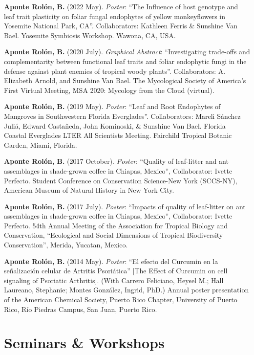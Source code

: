 \documentclass[11pt,a4paper,]{awesome-cv}
\begin{document}
\textbf{Aponte Rolón, B.} (2022 May). \emph{Poster}: ``The Influence of
host genotype and leaf trait plasticity on foliar fungal endophytes of
yellow monkeyflowers in Yosemite National Park, CA''. Collaborators:
Kathleen Ferris \& Sunshine Van Bael. Yosemite Symbiosis Workshop.
Wawona, CA, USA.

\textbf{Aponte Rolón, B.} (2020 July). \emph{Graphical Abstract}:
``Investigating trade-offs and complementarity between functional leaf
traits and foliar endophytic fungi in the defense against plant enemies
of tropical woody plants''. Collaborators: A. Elizabeth Arnold, and
Sunshine Van Bael. The Mycological Society of America's First Virtual
Meeting, MSA 2020: Mycology from the Cloud (virtual).

\textbf{Aponte Rolón, B.} (2019 May). \emph{Poster}: ``Leaf and Root
Endophytes of Mangroves in Southwestern Florida Everglades''.
Collaborators: Mareli Sánchez Juliá, Edward Castañeda, John Kominoski,
\& Sunshine Van Bael. Florida Coastal Everglades LTER All Scientists
Meeting. Fairchild Tropical Botanic Garden, Miami, Florida.

\textbf{Aponte Rolón, B.} (2017 October). \emph{Poster}: ``Quality of
leaf-litter and ant assemblages in shade-grown coffee in Chiapas,
Mexico'', Collaborator: Ivette Perfecto. Student Conference on
Conservation Science-New York (SCCS-NY), American Museum of Natural
History in New York City.

\textbf{Aponte Rolón, B.} (2017 July). \emph{Poster}: ``Impacts of
quality of leaf-litter on ant assemblages in shade-grown coffee in
Chiapas, Mexico'', Collaborator: Ivette Perfecto. 54th Annual Meeting of
the Association for Tropical Biology and Conservation, ``Ecological and
Social Dimensions of Tropical Biodiversity Conservation'', Merida,
Yucatan, Mexico.

\textbf{Aponte Rolón, B.} (2014 May). \emph{Poster}: ``El efecto del
Curcumin en la señalización celular de Artritis Psoriática'' {[}The
Effect of Curcumin on cell signaling of Psoriatic Arthritis{]}. (With
Carrero Feliciano, Heysel M.; Hall Laureano, Stephanie; Montes González,
Ingrid, PhD.) Annual poster presentation of the American Chemical
Society, Puerto Rico Chapter, University of Puerto Rico, Río Piedras
Campus, San Juan, Puerto Rico.

\hypertarget{seminars-workshops}{%
\section{\texorpdfstring{ Seminars \&
Workshops}{ Seminars \& Workshops}}\label{seminars-workshops}}
\end{document}

